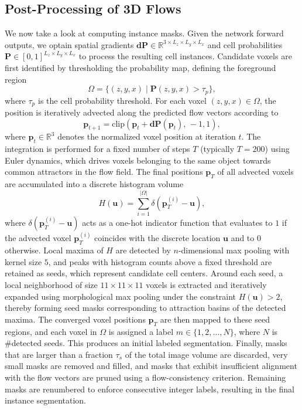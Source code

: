 \subsection{Post-Processing of 3D Flows} %

We now take a look at computing instance masks. Given the network forward outputs, we optain spatial gradients $\mathbf{dP} \in \mathbb{R}^{3 \times L_z \times L_y \times L_x}$ and cell probabilities $\mathbf{P} \in [0,1]^{L_z \times L_y \times L_x}$ to process the resulting cell instances. Candidate voxels are first identified by thresholding the probability map, defining the foreground region
\begin{equation}
\Omega = \{ (z,y,x) \mid \mathbf{P}(z,y,x) > \tau_p \},
\end{equation}
where $\tau_p$ is the cell probability threshold. For each voxel $(z,y,x) \in \Omega$, the position is iteratively advected along the predicted flow vectors according to
\begin{equation}
\mathbf{p}_{t+1} = \mathrm{clip}\!\left( \mathbf{p}_{t} + \mathbf{dP}(\mathbf{p}_{t}), \, -1, 1 \right),
\end{equation}
where $\mathbf{p}_t \in \mathbb{R}^3$ denotes the normalized voxel position at iteration $t$. The integration is performed for a fixed number of steps $T$ (typically $T=200$) using Euler dynamics, which drives voxels belonging to the same object towards common attractors in the flow field. The final positions $\mathbf{p}_T$ of all advected voxels are accumulated into a discrete histogram volume
\begin{equation}
H(\mathbf{u}) = \sum_{i=1}^{|\Omega|} \delta(\mathbf{p}_T^{(i)} - \mathbf{u}),
\end{equation}
where $\delta(\mathbf{p}_T^{(i)} - \mathbf{u})$ acts as a one-hot indicator function that evaluates to $1$ if the advected voxel $\mathbf{p}_T^{(i)}$ coincides with the discrete location $\mathbf{u}$ and to $0$ otherwise. Local maxima of $H$ are detected by $n$-dimensional max pooling with kernel size $5$, and peaks with histogram counts above a fixed threshold are retained as seeds, which represent candidate cell centers. Around each seed, a local neighborhood of size $11 \times 11 \times 11$ voxels is extracted and iteratively expanded using morphological max pooling under the constraint $H(\mathbf{u}) > 2$, thereby forming seed masks corresponding to attraction basins of the detected maxima. The converged voxel positions $\mathbf{p}_T$ are then mapped to these seed regions, and each voxel in $\Omega$ is assigned a label $m \in \{1,2,\dots,N\}$, where $N$ is \#detected seeds. This produces an initial labeled segmentation.
Finally, masks that are larger than a fraction $\tau_s$ of the total image volume are discarded, very small masks are removed and filled, and masks that exhibit insufficient alignment with the flow vectors are pruned using a flow-consistency criterion. Remaining masks are renumbered to enforce consecutive integer labels, resulting in the final instance segmentation.


